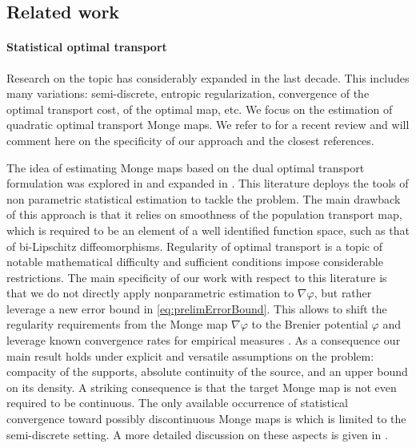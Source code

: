 \documentclass[11pt]{article}
\newcommand{\1}{\mathbbm{1}}
\numberwithin{equation}{section}
\begin{document}
\subsection{Related work}

\paragraph{Statistical optimal transport}
Research on the topic has considerably expanded in the last decade. This includes many variations: semi-discrete, entropic regularization, convergence of the optimal transport cost, of the optimal map, etc. We focus on the estimation of quadratic optimal transport Monge maps. We refer to \cite{balakrishnan2025statistical} for a recent review and will comment here on the specificity of our approach and the closest references.

The idea of estimating Monge maps based on the dual optimal transport formulation was explored in \cite{hutter2021minimax} and expanded in \cite{manole2024plugin,divol2025optimal}. This literature deploys the tools of non parametric statistical estimation to tackle the problem. The main drawback of this approach is that it relies on smoothness  of the population transport map, which is required to be an element of a well identified function space, such as that of bi-Lipschitz diffeomorphisms. Regularity of optimal transport is a topic of notable mathematical difficulty and sufficient conditions impose considerable restrictions. The main specificity of our work with respect to this literature is that we do not directly apply nonparametric estimation to $\nabla \varphi$, but rather leverage a new error bound in \eqref{eq:prelimErrorBound}. This allows to shift the regularity requirements from the Monge map $\nabla \varphi$ to the Brenier potential $\varphi$ and leverage known convergence rates for empirical measures \cite{fournier2015rate}. As a consequence our main result holds under explicit and versatile assumptions on the problem: compacity of the supports, absolute continuity of the source, and an upper bound on its density. A striking consequence is that the target Monge map is not even required to be continuous. The only available occurrence of statistical convergence toward possibly discontinuous Monge maps is \cite{pooladian2023minimax} which is limited to the semi-discrete setting. A more detailed discussion on these aspects is given in .
\end{document}
